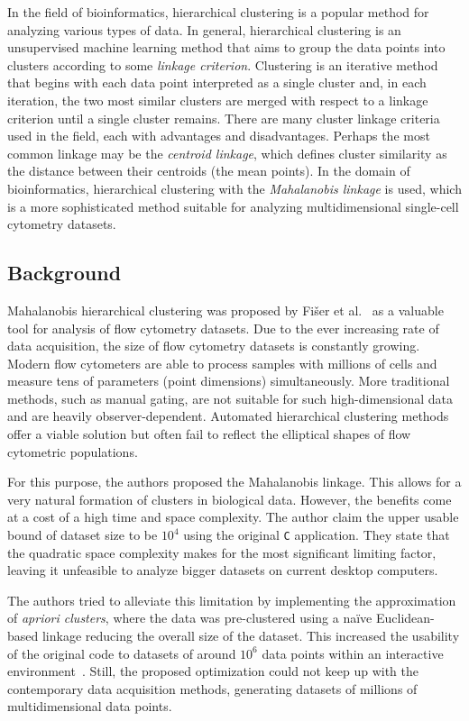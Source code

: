 In the field of bioinformatics, hierarchical clustering is a popular method for analyzing various types of data.
In general, hierarchical clustering is an unsupervised machine learning method that aims to group the data points into clusters according to some \emph{linkage criterion}.
Clustering is an iterative method that begins with each data point interpreted as a single cluster and, in each iteration, the two most similar clusters are merged with respect to a linkage criterion until a single cluster remains.
There are many cluster linkage criteria used in the field, each with advantages and disadvantages.
Perhaps the most common linkage may be the \emph{centroid linkage}, which defines cluster similarity as the distance between their centroids (the mean points). In the domain of bioinformatics, hierarchical clustering with the \emph{Mahalanobis linkage} is used, which is a more sophisticated method suitable for analyzing multidimensional single-cell cytometry datasets.

\subsection{Background}

Mahalanobis hierarchical clustering was proposed by Fišer et al.~\cite{fivser2012detection} as a valuable tool for analysis of flow cytometry datasets. Due to the ever increasing rate of data acquisition, the size of flow cytometry datasets is constantly growing. Modern flow cytometers are able to process samples with millions of cells and measure tens of parameters (point dimensions) simultaneously. More traditional methods, such as manual gating, are not suitable for such high-dimensional data and are heavily observer-dependent. Automated hierarchical clustering methods offer a viable solution but often fail to reflect the elliptical shapes of flow cytometric populations.

For this purpose, the authors proposed the Mahalanobis linkage. This allows for a very natural formation of clusters in biological data. However, the benefits come at a cost of a high time and space complexity. The author claim the upper usable bound of dataset size to be $10^4$ using the original \texttt{C} application. They state that the quadratic space complexity makes for the most significant limiting factor, leaving it unfeasible to analyze bigger datasets on current desktop computers.

The authors tried to alleviate this limitation by implementing the approximation of \emph{apriori clusters}, where the data was pre-clustered using a na\"{i}ve Euclidean-based linkage reducing the overall size of the dataset. This increased the usability of the original code to datasets of around $10^6$ data points within an interactive environment~\cite{kratochvil2020shinysom}. Still, the proposed optimization could not keep up with the contemporary data acquisition methods, generating datasets of millions of multidimensional data points.

